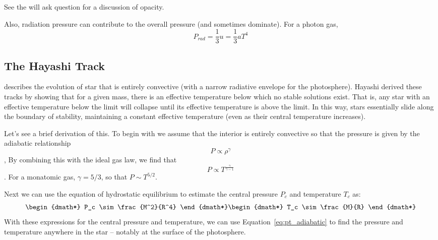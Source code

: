 See the will ask question for a discussion of opacity.

Also, radiation pressure can contribute to the overall pressure (and sometimes dominate).  
For a photon gas,
\begin{equation}
P_{rad}=\frac{1}{3}u=\frac{1}{3}aT^4
\end{equation}

\subsection{The Hayashi Track}\label{sec:hayashi}
describes the evolution of star that is entirely convective
(with a narrow radiative envelope for the photosphere).
Hayashi derived these tracks by showing that for
a given mass, there is an effective temperature below which no stable solutions exist.
That is, any star with an effective temperature below the limit will collapse until its
effective temperature is above the limit.  In this way, stars essentially slide along
the boundary of stability, maintaining a constant effective temperature
(even as their central temperature increases).

Let's see a brief derivation of this.  To begin with we assume that the interior is entirely
convective so that the pressure is given by the adiabatic relationship
\begin{dmath}
    P\propto\rho^\gamma
\end{dmath},
By combining this with the ideal gas law, we find that
\begin{dmath}\label{eq:pt_adiabatic}
    P\propto T^{\frac{\gamma}{\gamma-1}}
\end{dmath}.
For a monatomic gas, $\gamma=5/3$, so that $P\sim T^{5/2}$.

Next we can use the equation of hydrostatic equilibrium to estimate the central pressure $P_c$ and
temperature $T_c$ as:
\begin{dgroup*}
\begin{dmath*}
    P_c \sim \frac{M^2}{R^4}
\end{dmath*}
\begin{dmath*}
    T_c \sim \frac{M}{R}
\end{dmath*}
\end{dgroup*}
With these expressions for the central pressure and temperature, we can use
Equation~\ref{eq:pt_adiabatic} to find the pressure and temperature anywhere in the
star -- notably at the surface of the photosphere.

